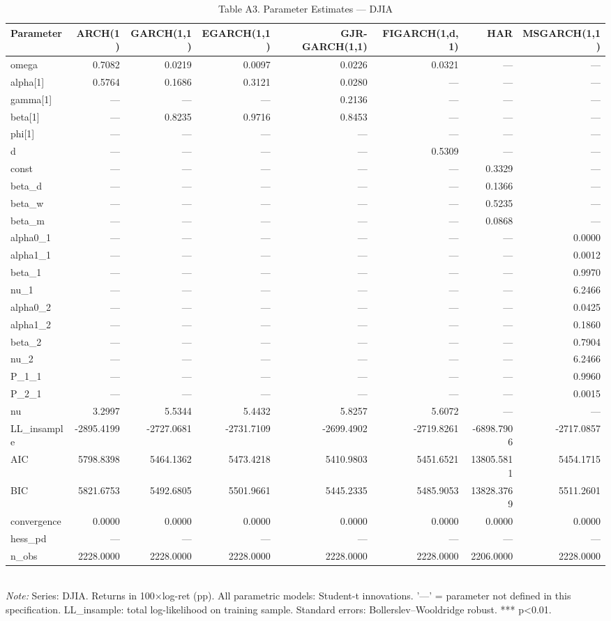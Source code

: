 \begin{table}[ht]
\centering
\caption{Table A3. Parameter Estimates — DJIA}
\label{tab:est_djia}
\begin{tabular}{lrrrrrrr}
\toprule
Parameter & ARCH(1) & GARCH(1,1) & EGARCH(1,1) & GJR-GARCH(1,1) & FIGARCH(1,d,1) & HAR & MSGARCH(1,1) \\
\midrule
omega & 0.7082 & 0.0219 & 0.0097 & 0.0226 & 0.0321 & — & — \\
alpha[1] & 0.5764 & 0.1686 & 0.3121 & 0.0280 & — & — & — \\
gamma[1] & — & — & — & 0.2136 & — & — & — \\
beta[1] & — & 0.8235 & 0.9716 & 0.8453 & — & — & — \\
phi[1] & — & — & — & — & — & — & — \\
d & — & — & — & — & 0.5309 & — & — \\
const & — & — & — & — & — & 0.3329 & — \\
beta_d & — & — & — & — & — & 0.1366 & — \\
beta_w & — & — & — & — & — & 0.5235 & — \\
beta_m & — & — & — & — & — & 0.0868 & — \\
alpha0_1 & — & — & — & — & — & — & 0.0000 \\
alpha1_1 & — & — & — & — & — & — & 0.0012 \\
beta_1 & — & — & — & — & — & — & 0.9970 \\
nu_1 & — & — & — & — & — & — & 6.2466 \\
alpha0_2 & — & — & — & — & — & — & 0.0425 \\
alpha1_2 & — & — & — & — & — & — & 0.1860 \\
beta_2 & — & — & — & — & — & — & 0.7904 \\
nu_2 & — & — & — & — & — & — & 6.2466 \\
P_1_1 & — & — & — & — & — & — & 0.9960 \\
P_2_1 & — & — & — & — & — & — & 0.0015 \\
nu & 3.2997 & 5.5344 & 5.4432 & 5.8257 & 5.6072 & — & — \\
LL_insample & -2895.4199 & -2727.0681 & -2731.7109 & -2699.4902 & -2719.8261 & -6898.7906 & -2717.0857 \\
AIC & 5798.8398 & 5464.1362 & 5473.4218 & 5410.9803 & 5451.6521 & 13805.5811 & 5454.1715 \\
BIC & 5821.6753 & 5492.6805 & 5501.9661 & 5445.2335 & 5485.9053 & 13828.3769 & 5511.2601 \\
convergence & 0.0000 & 0.0000 & 0.0000 & 0.0000 & 0.0000 & 0.0000 & 0.0000 \\
hess_pd & — & — & — & — & — & — & — \\
n_obs & 2228.0000 & 2228.0000 & 2228.0000 & 2228.0000 & 2228.0000 & 2206.0000 & 2228.0000 \\
\bottomrule
\end{tabular}
\\[3pt]\footnotesize\textit{Note:} Series: DJIA. Returns in 100×log-ret (pp). All parametric models: Student-t innovations. '—' = parameter not defined in this specification. LL_insample: total log-likelihood on training sample. Standard errors: Bollerslev–Wooldridge robust. *** p<0.01.
\end{table}